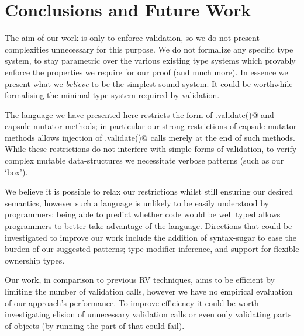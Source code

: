 \section{Conclusions and Future Work}
The aim of our work is only to enforce validation, so we do not present complexities unnecessary for this purpose. We do not formalize any specific type system, to stay parametric over 
the various existing type systems which provably enforce the properties we require for our proof (and much more).
In essence we present what we \emph{believe} to be the simplest sound system.
It could be worthwhile formalising the minimal type system required by validation.






The language we have presented here restricts the form of \Q@.validate()@
and capsule mutator methods; in particular
our strong restrictions of capsule mutator methods
allows injection of \Q@.validate()@ calls merely at the end of such methods.
While these restrictions do not interfere with simple
forms of validation, to verify complex mutable data-structures we necessitate verbose patterns (such as our `box').

We believe it is possible to relax our restrictions whilst
still ensuring our desired semantics, however such a language is unlikely to be easily understood by programmers;
being able to predict whether code would be well typed allows programmers
to better take advantage of the language.
Directions that could be investigated to improve our work include the addition of syntax-sugar to ease the burden of our suggested patterns; type-modifier inference, and support for flexible ownership types.

Our work, in comparison to previous RV techniques, aims to be efficient by limiting the number of validation calls, however we have no empirical evaluation of our approach's performance.
To improve efficiency it could be worth investigating elision of unnecessary validation calls
or even only validating parts of objects (by running the part of \Q@validate@ that could fail).